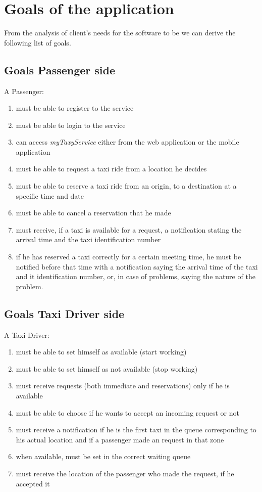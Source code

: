 \section{Goals of the application}
From the analysis of client's needs for the software to be we can derive the following list of goals.
\subsection{Goals Passenger side}
A Passenger:
\begin{enumerate}
\item must be able to register to the service
\item must be able to login to the service
\item can access \textit{myTaxyService} either from the web application or the mobile application
\item must be able to request a taxi ride from a location he decides
\item must be able to reserve a taxi ride from an origin, to a destination at a specific time and date
\item must be able to cancel a reservation that he made
\item must receive, if a taxi is available for a request, a notification stating the arrival time and the taxi identification number
\item if he has reserved a taxi correctly for a certain meeting time, he must be notified before that time with a notification saying the arrival time of the taxi and it identification number, or, in case of problems, saying the nature of the problem.
\end{enumerate}
\subsection{Goals Taxi Driver side}
A Taxi Driver:
\begin{enumerate}
\item must be able to set himself as available (start working) 
\item must be able to set himself as not available (stop working)
\item must receive requests (both immediate and reservations) only if he is available 
\item must be able to choose if he wants to accept an incoming request or not
\item must receive a notification if he is the first taxi in the queue corresponding to his actual location and if a passenger made an request in that zone
\item when available, must be set in the correct waiting queue
\item must receive the location of the passenger who made the request, if he accepted it
\end{enumerate}


